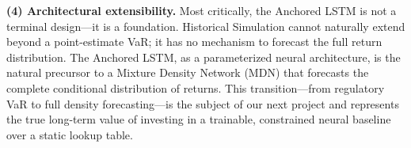 \textbf{(4) Architectural extensibility.} Most critically, the Anchored LSTM is not a terminal design---it is a foundation. Historical Simulation cannot naturally extend beyond a point-estimate VaR; it has no mechanism to forecast the full return distribution. The Anchored LSTM, as a parameterized neural architecture, is the natural precursor to a Mixture Density Network (MDN) that forecasts the complete conditional distribution of returns. This transition---from regulatory VaR to full density forecasting---is the subject of our next project and represents the true long-term value of investing in a trainable, constrained neural baseline over a static lookup table.